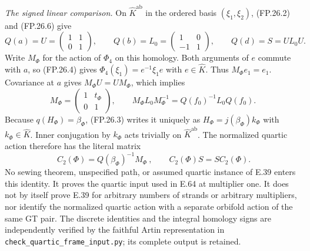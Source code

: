 \emph{The signed linear comparison.}
On $\widehat K^{\mathrm{ab}}$ in the ordered basis
$(\xi_1,\xi_2)$, (FP.26.2) and (FP.26.6) give
\[
 Q(a)=U=\begin{pmatrix}1&1\\0&1\end{pmatrix},\qquad
 Q(b)=L_0=\begin{pmatrix}1&0\\-1&1\end{pmatrix},\qquad
 Q(d)=S=UL_0U.
\]
Write $M_\Phi$ for the action of $\Phi_4$ on this homology.
Both arguments of $e$ commute with $a$, so (FP.26.4) gives
$\Phi_4(\xi_1)=e^{-1}\xi_1e$ with $e\in\widehat K$.
Thus $M_\Phi e_1=e_1$. Covariance at $a$ gives
$M_\Phi U=UM_\Phi$, which implies
\[
 M_\Phi=\begin{pmatrix}1&t_\Phi\\0&1\end{pmatrix},\qquad
 M_\Phi L_0M_\Phi^{-1}
       =Q(f_0)^{-1}L_0Q(f_0).
\]
Because $q(H_\Phi)=\beta_\Phi$, (FP.26.3) writes it uniquely as
$H_\Phi=j(\beta_\Phi)k_\Phi$ with $k_\Phi\in\widehat K$.
Inner conjugation by $k_\Phi$ acts trivially on
$\widehat K^{\mathrm{ab}}$. The normalized quartic action therefore
has the literal matrix
\[
 \boxed{\ C_2(\Phi)=Q(\beta_\Phi)^{-1}M_\Phi\ },\qquad
 C_2(\Phi)S=SC_2(\Phi).
 \tag{FP.26.8}
\]
No sewing theorem, unspecified path, or assumed quartic instance of E.39
enters this identity. It proves the quartic input used in E.64 at
multiplier one. It does not by itself prove E.39 for arbitrary numbers
of strands or arbitrary multipliers, nor identify the normalized quartic
action with a separate orbifold action of the same GT pair.
The discrete identities and the integral homology signs are independently
verified by the faithful Artin representation in
\texttt{check\_quartic\_frame\_input.py}; its complete output is retained.

